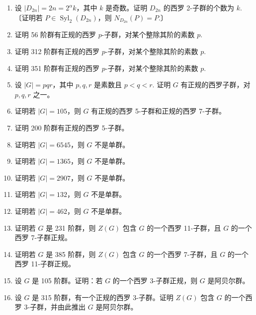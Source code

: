 \begin{enumerate}
\item 设 \(|D_{2n}| = 2n = 2^\alpha k\)，其中 \(k\) 是奇数。证明 \(D_{2n}\) 的西罗 2-子群的个数为 \(k\).〔证明若 \(P \in \operatorname{Syl}_2(D_{2n})\)，则 \(N_{D_{2n}}(P) = P\).〕

\item 证明 56 阶群有正规的西罗 \(p\)-子群，对某个整除其阶的素数 \(p\).

\item 证明 312 阶群有正规的西罗 \(p\)-子群，对某个整除其阶的素数 \(p\).

\item 证明 351 阶群有正规的西罗 \(p\)-子群，对某个整除其阶的素数 \(p\).

\item 设 \(|G| = pqr\)，其中 \(p, q, r\) 是素数且 \(p < q < r\). 证明 \(G\) 有正规的西罗子群，对 \(p, q, r\) 之一。

\item 证明若 \(|G| = 105\)，则 \(G\) 有正规的西罗 5-子群和正规的西罗 7-子群。

\item 证明 200 阶群有正规的西罗 5-子群。

\item 证明若 \(|G| = 6545\)，则 \(G\) 不是单群。

\item 证明若 \(|G| = 1365\)，则 \(G\) 不是单群。

\item 证明若 \(|G| = 2907\)，则 \(G\) 不是单群。

\item 证明若 \(|G| = 132\)，则 \(G\) 不是单群。

\item 证明若 \(|G| = 462\)，则 \(G\) 不是单群。

\item 证明若 \(G\) 是 231 阶群，则 \(Z(G)\) 包含 \(G\) 的一个西罗 11-子群，且 \(G\) 的一个西罗 7-子群正规。

\item 证明若 \(G\) 是 385 阶群，则 \(Z(G)\) 包含 \(G\) 的一个西罗 7-子群，且 \(G\) 的一个西罗 11-子群正规。

\item 设 \(G\) 是 105 阶群。证明：若 \(G\) 的一个西罗 3-子群正规，则 \(G\) 是阿贝尔群。

\item 设 \(G\) 是 315 阶群，有一个正规的西罗 3-子群。证明 \(Z(G)\) 包含 \(G\) 的一个西罗 3-子群，并由此推出 \(G\) 是阿贝尔群。


\end{enumerate}

